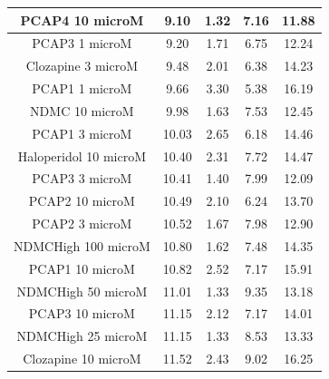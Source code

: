 \documentclass[a4paper,12pt]{article}
\begin{document}
\begin{table}[h!]
\begin{tabular}{|c|c|c|c|c|}
PCAP4 10 microM      & 9.10   & 1.32 & 7.16 & 11.88 \\ \hline
PCAP3 1 microM       & 9.20   & 1.71 & 6.75 & 12.24 \\ \hline
Clozapine 3 microM     & 9.48  & 2.01 & 6.38 & 14.23 \\ \hline
PCAP1 1 microM         & 9.66  & 3.30  & 5.38 & 16.19 \\ \hline
NDMC 10 microM         & 9.98  & 1.63 & 7.53 & 12.45 \\ \hline
PCAP1 3 microM         & 10.03 & 2.65 & 6.18 & 14.46 \\ \hline
Haloperidol 10 microM  & 10.40  & 2.31 & 7.72 & 14.47 \\ \hline
PCAP3 3 microM       & 10.41 & 1.40  & 7.99 & 12.09 \\ \hline
PCAP2 10 microM        & 10.49 & 2.10  & 6.24 & 13.70  \\ \hline
PCAP2 3 microM         & 10.52 & 1.67 & 7.98 & 12.90  \\ \hline
NDMCHigh 100 microM    & 10.80  & 1.62 & 7.48 & 14.35 \\ \hline
PCAP1 10 microM        & 10.82 & 2.52 & 7.17 & 15.91 \\ \hline
NDMCHigh 50 microM     & 11.01 & 1.33 & 9.35 & 13.18 \\ \hline
PCAP3 10 microM      & 11.15 & 2.12 & 7.17 & 14.01 \\ \hline
NDMCHigh 25 microM     & 11.15 & 1.33 & 8.53 & 13.33 \\ \hline
Clozapine 10 microM    & 11.52 & 2.43 & 9.02 & 16.25 \\ \hline
\end{tabular}
\end{table}
\newpage
\end{document}
